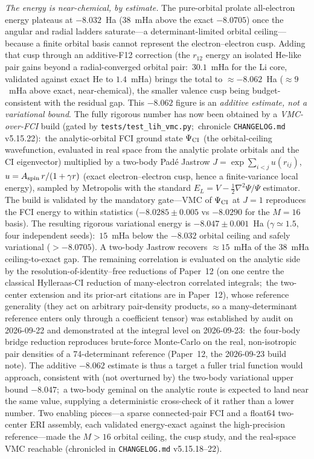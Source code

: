 \documentclass[aps,pra,twocolumn,superscriptaddress,longbibliography]{revtex4-2}
\begin{document}
\emph{The energy is near-chemical, by estimate.}  The pure-orbital prolate
all-electron energy plateaus at $-8.032$~Ha ($38$~mHa above the exact $-8.0705$)
once the angular and radial ladders saturate---a determinant-limited orbital
ceiling---because a finite orbital basis
cannot represent the electron--electron cusp.  Adding that cusp through an
additive-F12 correction (the $r_{12}$ energy an isolated He-like pair gains beyond
a radial-converged orbital pair:\ $30.1$~mHa for the Li core, validated against
exact He to $1.4$~mHa) brings the total to $\approx-8.062$~Ha ($\approx9$~mHa above
exact, near-chemical), the smaller valence cusp being budget-consistent with the
residual gap.  This $-8.062$ figure is an \emph{additive estimate, not a
variational bound}.  The fully rigorous number has now been obtained by a
\emph{VMC-over-FCI} build (gated by \texttt{tests/test\_lih\_vmc.py};\ chronicle
\texttt{CHANGELOG.md} v5.15.22):\ the analytic-orbital FCI
ground state $\Psi_{\rm CI}$ (the orbital-ceiling wavefunction, evaluated in real
space from the analytic prolate orbitals and the CI eigenvector) multiplied by a
two-body Pad\'e Jastrow $J=\exp\sum_{i<j}u(r_{ij})$, $u=A_{\rm spin}\,
r/(1+\gamma r)$ (exact electron--electron cusp, hence a finite-variance local
energy), sampled by Metropolis with the standard $E_L=V-\tfrac12\nabla^2\Psi/\Psi$
estimator.  The build is validated by the mandatory gate---VMC of $\Psi_{\rm CI}$
at $J=1$ reproduces the FCI energy to within statistics ($-8.0285\pm0.005$ vs
$-8.0290$ for the $M=16$ basis).  The resulting rigorous variational energy is
$\mathbf{-8.047\pm0.001}$~Ha ($\gamma\simeq1.5$, four independent seeds):\ $15$~mHa
below the $-8.032$ orbital ceiling and safely variational ($>-8.0705$).  A two-body Jastrow
recovers $\approx15$~mHa of the $38$~mHa ceiling-to-exact gap.  The remaining
correlation is evaluated on the analytic side by the
resolution-of-identity--free reductions of Paper~12 (on one centre the classical
Hylleraas-CI reduction of many-electron correlated integrals;\ the two-center
extension and its prior-art citations are in Paper~12), whose reference generality
(they act on arbitrary pair-density products, so a many-determinant reference
enters only through a coefficient tensor) was established by audit on
2026-09-22 and demonstrated at the integral level on 2026-09-23:\ the
four-body bridge reduction reproduces brute-force Monte-Carlo on the real,
non-isotropic pair densities of a 74-determinant reference (Paper~12, the
2026-09-23 build note).  The additive $-8.062$ estimate is thus a target a fuller trial
function would approach, consistent with (not overturned by) the two-body
variational upper bound $-8.047$;\ a two-body geminal on the analytic route is
expected to land near the same value, supplying a deterministic cross-check of
it rather than a lower number.  Two enabling
pieces---a sparse connected-pair FCI and a float64 two-center ERI assembly, each
validated energy-exact against the high-precision reference---made the $M>16$
orbital ceiling, the cusp study, and the real-space VMC reachable (chronicled in
\texttt{CHANGELOG.md} v5.15.18--22).
\end{document}

